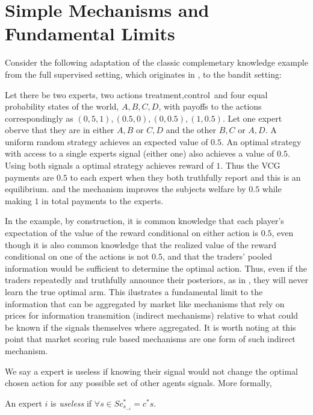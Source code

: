 \section{Simple Mechanisms and Fundamental Limits}

Consider the following adaptation of the classic complemetary knowledge example from the full supervised setting, which originates in \cite{geanakoplos1982we}, to the bandit setting:

\begin{eg}\label{eg:comp-ex}
	Let there be two experts, two actions ${\text{treatment},\text{control}}$ and four equal probability states of the world, ${A,B,C,D}$, with payoffs to the actions correspondingly as ${(0,5,1),(0.5,0),(0,0.5),(1,0.5)}$. Let one expert oberve that they are in either ${A,B}$ or ${C,D}$ and the other ${B,C}$ or ${A,D}$. A uniform random strategy achieves an expected value of $0.5$. An optimal strategy with access to a single experts signal (either one) also achieves a value of $0.5$. Using both signals a optimal strategy achieves reward of $1$. Thus the VCG payments are $0.5$ to each expert when they both truthfully report and this is an equilibrium. and the mechanism improves the subjects welfare by $0.5$ while making $1$ in total payments to the experts. 
\end{eg}

In the example, by construction, it is common knowledge that each player’s expectation of the value of the reward conditional on either action is $0.5$, even though it is also common knowledge that the realized value of the reward conditional on one of the actions is not $0.5$, and that the traders’ pooled information would be sufficient to determine the optimal action. 
Thus, even if the traders repeatedly and truthfully announce their posteriors, as in \cite{geanakoplos1982we}, they will never learn the true optimal arm. 
This ilustrates a fundamental limit to the information that can be aggregated by market like mechanisms that rely on prices for information transmition (indirect mechanisms) relative to what could be known if the signals themselves where aggregated. 
It is worth noting at this point that market scoring rule based mechanisms are one form of such indirect mechanism.


We say a expert is useless if knowing their signal would not change the optimal chosen action for any possible set of other agents signals. More formally,

\begin{defn}\label{defn:useless}
	An expert $i$ is \emph{useless} if $\forall s  \in S c^{*}_{s_{-i}} = c^{*}{s}$.
\end{defn}


